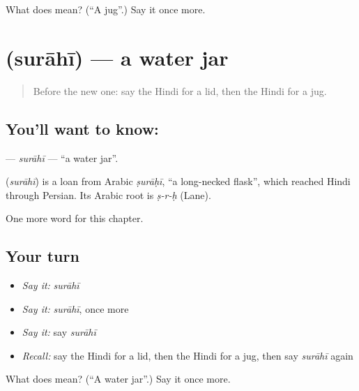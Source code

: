\begin{tcolorbox}[breakable,colback=teal!4,colframe=teal!35!black,title={Before you move on}]
What does  mean? (\textquotedblleft{}A jug\textquotedblright{}.) Say it once more.
\end{tcolorbox}
\section[\texorpdfstring{\hi{सुराही} (surāhī)}{सुराही (surāhī)}]{ (surāhī) — a water jar}

\label{lesson:HI-C270-surahi}



\begin{quote}
Before the new one: say the Hindi for a lid, then the Hindi for a jug.
\end{quote}

\subsection*{You'll want to know: }
\textbf{} — \emph{surāhī} — \textquotedblleft{}a water jar\textquotedblright{}.

\begin{cousinweb}
\textbf{} (\emph{surāhī}) is a loan from Arabic \emph{ṣurāḥī}, \textquotedblleft{}a long-necked flask\textquotedblright{}, which reached Hindi through Persian. Its Arabic root is \emph{ṣ-r-ḥ} (Lane).
\end{cousinweb}

\begin{grammarlens}[title={What you've built}]
One more word for this chapter.
\end{grammarlens}

\subsection*{Your turn}
\begin{itemize}
\raggedright
  \item \emph{Say it:} \emph{surāhī}
  \item \emph{Say it:} \emph{surāhī}, once more
  \item \emph{Say it:} say \emph{surāhī}
  \item \emph{Recall:} say the Hindi for a lid, then the Hindi for a jug, then say \emph{surāhī} again
\end{itemize}

\begin{tcolorbox}[breakable,colback=teal!4,colframe=teal!35!black,title={Before you move on}]
What does  mean? (\textquotedblleft{}A water jar\textquotedblright{}.) Say it once more.
\end{tcolorbox}

